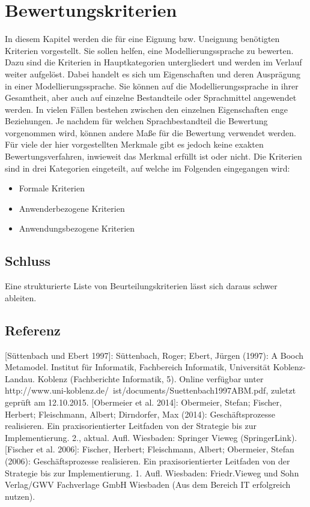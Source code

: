 

\chapter{Bewertungskriterien}
\label{ch:Bewertungskriterien}
In diesem Kapitel werden die für eine Eignung bzw. Uneignung benötigten Kriterien vorgestellt.
Sie sollen helfen, eine Modellierungssprache zu bewerten. Dazu sind die Kriterien in Hauptkategorien untergliedert und werden im Verlauf weiter aufgelöst. 
Dabei handelt es sich um Eigenschaften und deren Ausprägung in einer Modellierungssprache.
Sie können auf die Modellierungssprache in ihrer Gesamtheit, aber auch auf einzelne Bestandteile oder Sprachmittel angewendet werden.
In vielen Fällen bestehen zwischen den einzelnen Eigenschaften enge Beziehungen.
Je nachdem für welchen Sprachbestandteil die Bewertung vorgenommen wird, können andere Maße für die Bewertung verwendet werden.
Für viele der hier vorgestellten Merkmale gibt es jedoch keine exakten Bewertungsverfahren, inwieweit das Merkmal erfüllt ist oder nicht.
Die Kriterien sind in drei Kategorien eingeteilt, auf welche im Folgenden eingegangen wird:

\begin{itemize}
	\item Formale Kriterien
	\item Anwenderbezogene Kriterien
	\item Anwendungsbezogene Kriterien
\end{itemize}






\section{Schluss}
Eine strukturierte Liste von Beurteilungskriterien lässt sich daraus schwer ableiten.

\section{Referenz}
[Süttenbach und Ebert 1997]: Süttenbach, Roger; Ebert, Jürgen (1997): A Booch Metamodel. Institut für Informatik, Fachbereich Informatik, Universität Koblenz-Landau. Koblenz (Fachberichte Informatik, 5). Online verfügbar unter http://www.uni-koblenz.de/~ist/documents/Suettenbach1997ABM.pdf, zuletzt geprüft am 12.10.2015.
[Obermeier et al. 2014]: Obermeier, Stefan; Fischer, Herbert; Fleischmann, Albert; Dirndorfer, Max (2014): Geschäftsprozesse realisieren. Ein praxisorientierter Leitfaden von der Strategie bis zur Implementierung. 2., aktual. Aufl. Wiesbaden: Springer Vieweg (SpringerLink).
[Fischer et al. 2006]: Fischer, Herbert; Fleischmann, Albert; Obermeier, Stefan (2006): Geschäftsprozesse realisieren. Ein praxisorientierter Leitfaden von der Strategie bis zur Implementierung. 1. Aufl. Wiesbaden: Friedr.Vieweg und Sohn Verlag/GWV Fachverlage GmbH Wiesbaden (Aus dem Bereich IT erfolgreich nutzen).

